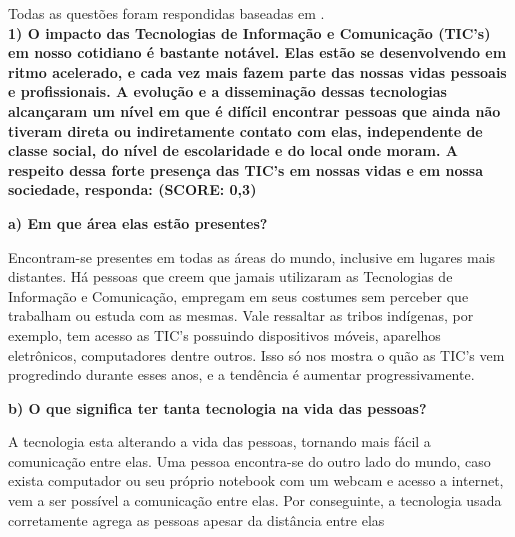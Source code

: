 \documentclass[
	article,			%
	11pt,				%
	oneside,			%
	a4paper,			%
	english,			%
	brazil,				%
	sumario=tradicional
	]{abntex2}
\begin{document}
\frenchspacing 



\maketitle



\textual


Todas as questões foram respondidas baseadas em .\\

\textbf{1) O impacto das Tecnologias de Informação e Comunicação (TIC’s) em nosso cotidiano é bastante notável. Elas estão se desenvolvendo em ritmo acelerado, e cada vez mais fazem parte das nossas vidas pessoais e profissionais. A evolução e a disseminação dessas tecnologias alcançaram um nível em que é difícil encontrar pessoas que ainda não tiveram direta ou indiretamente contato com elas, independente de classe social, do nível de escolaridade e do local onde moram. A respeito dessa forte presença das TIC’s em nossas vidas e em nossa sociedade, responda: (SCORE: 0,3)}

\textbf{a) Em que área elas estão presentes?}

Encontram-se presentes em todas as áreas do mundo, inclusive em lugares mais distantes.
Há pessoas que creem que jamais utilizaram as Tecnologias de Informação e Comunicação, empregam em seus costumes sem perceber que trabalham ou estuda com as mesmas. Vale ressaltar as tribos indígenas, por exemplo, tem acesso as TIC's possuindo dispositivos móveis, aparelhos eletrônicos, computadores dentre outros. Isso só nos mostra o quão as TIC's vem progredindo durante esses anos, e a tendência é aumentar progressivamente.

\textbf{b) O que significa ter tanta tecnologia na vida das pessoas?}

A tecnologia esta alterando a vida das pessoas, tornando mais fácil a comunicação entre elas. Uma pessoa encontra-se do outro lado do mundo, caso exista computador ou seu próprio notebook com um webcam e acesso a internet, vem a ser possível a comunicação entre elas. Por conseguinte, a tecnologia usada corretamente agrega as pessoas apesar da distância entre elas
\end{document}
